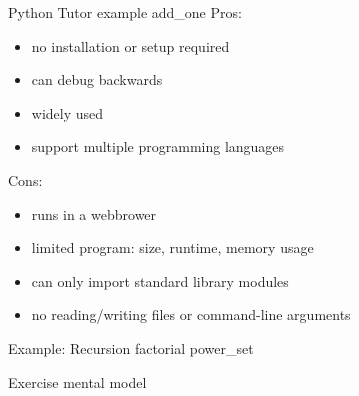 \documentclass[10pt, colorlinks=true, urlcolor=blue]{beamer}
\begin{document}
\begin{frame}{Python Tutor}
  example add\_one
  Pros:
  \begin{itemize}
  \item no installation or setup required
  \item can debug backwards
  \item widely used
  \item support multiple programming languages
  \end{itemize}
  Cons:
  \begin{itemize}
  \item runs in a webbrower
  \item limited program: size, runtime, memory usage
  \item can only import standard library modules
  \item no reading/writing files or command-line arguments
  \end{itemize}
\end{frame}

\begin{frame}{Example: Recursion}
  factorial
  power\_set
\end{frame}

\begin{frame}{Exercise}
  mental model
\end{frame}
\end{document}
